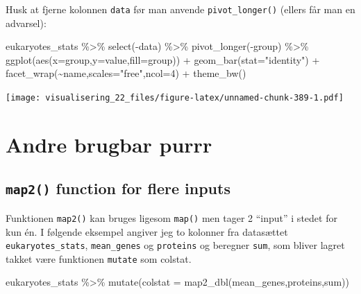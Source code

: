 \documentclass[
]{book}
\newenvironment{Shaded}{\begin{snugshade}}{\end{snugshade}}
\newcommand{\AttributeTok}[1]{\textcolor[rgb]{0.77,0.63,0.00}{#1}}
\newcommand{\DecValTok}[1]{\textcolor[rgb]{0.00,0.00,0.81}{#1}}
\newcommand{\FunctionTok}[1]{\textcolor[rgb]{0.00,0.00,0.00}{#1}}
\newcommand{\NormalTok}[1]{#1}
\newcommand{\SpecialCharTok}[1]{\textcolor[rgb]{0.00,0.00,0.00}{#1}}
\newcommand{\StringTok}[1]{\textcolor[rgb]{0.31,0.60,0.02}{#1}}
\begin{document}
Husk at fjerne kolonnen \texttt{data} før man anvende \texttt{pivot\_longer()} (ellers får man en advarsel):

\begin{Shaded}
\begin{Highlighting}[]
\NormalTok{eukaryotes\_stats }\SpecialCharTok{\%\textgreater{}\%} 
  \FunctionTok{select}\NormalTok{(}\SpecialCharTok{{-}}\NormalTok{data) }\SpecialCharTok{\%\textgreater{}\%}
  \FunctionTok{pivot\_longer}\NormalTok{(}\SpecialCharTok{{-}}\NormalTok{group) }\SpecialCharTok{\%\textgreater{}\%}
  \FunctionTok{ggplot}\NormalTok{(}\FunctionTok{aes}\NormalTok{(}\AttributeTok{x=}\NormalTok{group,}\AttributeTok{y=}\NormalTok{value,}\AttributeTok{fill=}\NormalTok{group)) }\SpecialCharTok{+} 
  \FunctionTok{geom\_bar}\NormalTok{(}\AttributeTok{stat=}\StringTok{"identity"}\NormalTok{) }\SpecialCharTok{+} 
  \FunctionTok{facet\_wrap}\NormalTok{(}\SpecialCharTok{\textasciitilde{}}\NormalTok{name,}\AttributeTok{scales=}\StringTok{"free"}\NormalTok{,}\AttributeTok{ncol=}\DecValTok{4}\NormalTok{) }\SpecialCharTok{+} 
  \FunctionTok{theme\_bw}\NormalTok{()}
\end{Highlighting}
\end{Shaded}

\texttt{[image: visualisering\_22\_files/figure-latex/unnamed-chunk-389-1.pdf]}

\hypertarget{andre-brugbar-purrr}{%
\section{Andre brugbar purrr}\label{andre-brugbar-purrr}}

\hypertarget{map2-function-for-flere-inputs}{%
\subsection{\texorpdfstring{\texttt{map2()} function for flere inputs}{map2() function for flere inputs}}\label{map2-function-for-flere-inputs}}

Funktionen \texttt{map2()} kan bruges ligesom \texttt{map()} men tager 2 ``input'' i stedet for kun én. I følgende eksempel angiver jeg to kolonner fra datasættet \texttt{eukaryotes\_stats}, \texttt{mean\_genes} og \texttt{proteins} og beregner \texttt{sum}, som bliver lagret takket være funktionen \texttt{mutate} som colstat.

\begin{Shaded}
\begin{Highlighting}[]
\NormalTok{eukaryotes\_stats }\SpecialCharTok{\%\textgreater{}\%} \FunctionTok{mutate}\NormalTok{(}\AttributeTok{colstat =} \FunctionTok{map2\_dbl}\NormalTok{(mean\_genes,proteins,sum))}
\end{Highlighting}
\end{Shaded}
\end{document}
